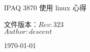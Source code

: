 \begin{titlepage}
\fontsize{30}{30pt plus.5pt minux.4pt}\selectfont
\noindent
IPAQ 3870 使用 linux 心得

\fontsize{14}{20pt plus.5pt minux.4pt}\selectfont
\par\vfill\noindent


文件版本：$Rev: 323 $\\
$Author: descent $

\today

\end{titlepage}

